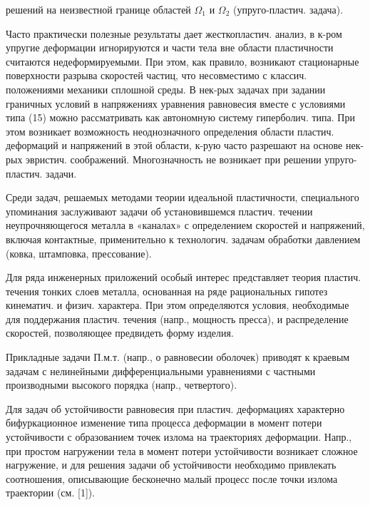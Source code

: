 \documentclass[10pt]{article}
\begin{document}
решений на неизвестной границе областей $\Omega_{1}$ и $\Omega_{2}$ (упруго-пластич. задача).



Часто практически полезные результаты дает жесткопластич. анализ, в к-ром упругие деформации игнорируются и части тела вне области пластичности считаются недеформируемыми. При этом, как правило, возникают стационарные поверхности разрыва скоростей частиц, что несовместимо с классич. положениями механики сплошной среды. В нек-рых задачах при задании граничных условий в напряжениях уравнения равновесия вместе с условиями типа (15) можно рассматривать как автономную систему гиперболич. типа. При этом возникает возможность неоднозначного определения области пластич. деформаций и напряжений в этой области, к-рую часто разрешают на основе нек-рых эвристич. соображений. Многозначность не возникает при решении упруго-пластич. задачи.



Среди задач, решаемых методами теории идеальной пластичности, специального упоминания заслуживают задачи об установившемся пластич. течении неупрочняющегося металла в «каналах» с определением скоростей и напряжений, включая контактные, применительно к технологич. задачам обработки давлением (ковка, штамповка, прессование).



Для ряда инженерных приложений особый интерес представляет теория пластич. течения тонких слоев металла, основанная на ряде рациональных гипотез кинематич. и физич. характера. При этом определяются условия, необходимые для поддержания пластич. течения (напр., мощность пресса), и распределение скоростей, позволяющее предвидеть форму изделия.



Прикладные задачи П.м.т. (напр., о равновесии оболочек) приводят к краевым задачам с нелинейными дифференциальными уравнениями с частными производными высокого порядка (напр., четвертого).



Для задач об устойчивости равновесия при пластич. деформациях характерно бифуркационное изменение типа процесса деформации в момент потери устойчивости с образованием точек излома на траекториях деформации. Напр., при простом нагружении тела в момент потери устойчивости возникает сложное нагружение, и для решения задачи об устойчивости необходимо привлекать соотношения, описывающие бесконечно малый процесс после точки излома траектории (см. [1]).
\end{document}
